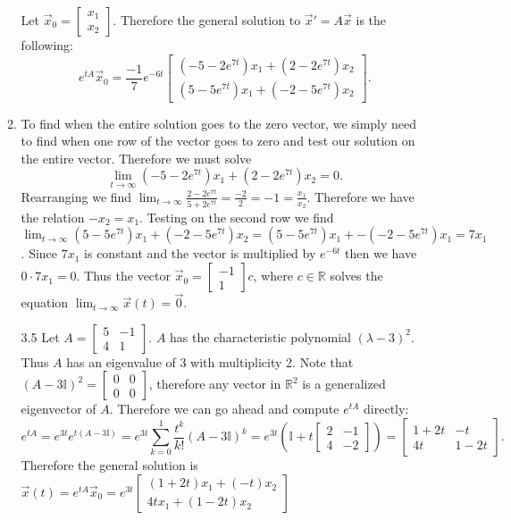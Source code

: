 \documentclass[12pt, letterpaper]{article}
\newcommand{\R}{\mathbb{R}}
\begin{document}
\begin{enumerate}
\begin{enumerate}
	Let $\Vec{x}_0 = \begin{bmatrix} x_1 \\ x_2 \end{bmatrix}$.  Therefore the general solution to $\Vec{x}' = A \Vec{x}$ is the following:
	$$
	e^{tA}\Vec{x}_0 = \frac{-1}{7} e^{-6t} \begin{bmatrix} (-5 -2e^{7t})x_1 + (2 - 2e^{7t})x_2 \\ (5 - 5e^{7t})x_1 + (-2 -5e^{7t}) x_2 \end{bmatrix}.
	$$
	\item To find when the entire solution goes to the zero vector, we simply need to find when one row of the vector goes to zero and test our solution on the entire vector.  Therefore we must solve 
	$$ 
		\lim_{t \to \infty} (-5 -2e^{7t})x_1 + (2 - 2e^{7t})x_2 = 0.
	$$  
	Rearranging we find $\displaystyle \lim_{t \to \infty} \frac{2 - 2e^{7t}}{5 + 2e^{7t}} = \frac{-2}{2} = -1 = \frac{x_1}{x_2}$.
	Therefore we have the relation $-x_2 = x_1$.  Testing on the second row we find $\displaystyle \lim_{t\to \infty} (5 - 5e^{7t})x_1 + (-2 -5e^{7t}) x_2 = (5 - 5e^{7t})x_1 + -(-2 -5e^{7t}) x_1 = 7 x_1$.  Since $7 x_1$ is constant and the vector is multiplied by  $e^{-6t}$ then we have $0 \cdot 7 x_1 = 0$.  Thus the vector $\Vec{x}_0 = \begin{bmatrix} -1	\\ 1\end{bmatrix}c$, where $c \in \R$ solves the equation $\lim_{t \to \infty} \Vec{x}(t) = \Vec{0}$.
	\newpage
	\item[3.5]
	Let $A=\begin{bmatrix} 5 & -1\\ 4 & 1 \end{bmatrix}$.  $A$ has the characteristic polynomial $(\lambda - 3)^2$.  Thus $A$ has an eigenvalue of 3 with multiplicity 2.  Note that $(A-3\mathbb{I})^2 = \begin{bmatrix} 0 & 0 \\ 0 & 0\end{bmatrix}$, therefore any vector in $\R^2$ is a generalized eigenvector of $A$.  Therefore we can go ahead and compute $e^{tA}$ directly:
	$$
	e^{tA} = e^{3t}e^{t(A - 3\mathbb{I})} = e^{3t}\sum_{k=0}^1 \frac{t^k}{k!} (A-3 \mathbb{I})^k = e^{3t} \left( \mathbb{I} + t\begin{bmatrix}
	2 & -1\\ 4 & -2	\end{bmatrix}\right) = \begin{bmatrix}1 + 2t & -t\\4t&1-2t	\end{bmatrix}.	
	$$
	Therefore the general solution is $\Vec{x}(t) = e^{tA}\Vec{x}_0 = e^{3t}\begin{bmatrix} (1+2t) x_1 + (-t)x_2 \\ 4tx_1 + (1-2t)x_2 \end{bmatrix}$
	\end{enumerate}		
\end{enumerate}
\end{document}
